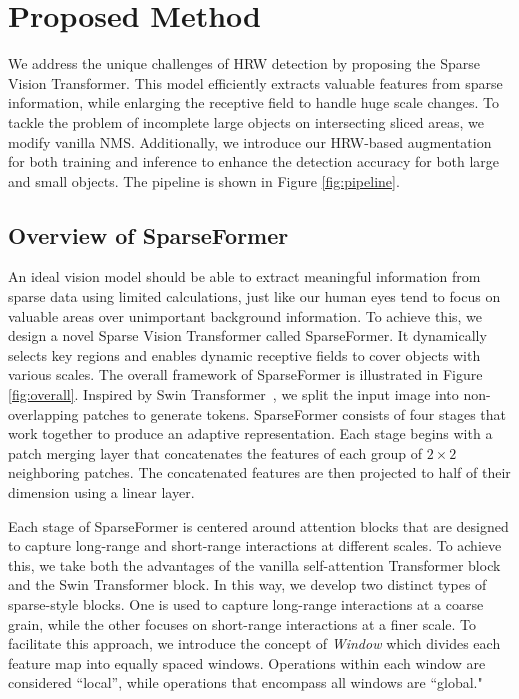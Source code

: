 \section{Proposed Method}


We address the unique challenges of HRW detection by proposing the Sparse Vision Transformer. This model efficiently extracts valuable features from sparse information, while enlarging the receptive field to handle huge scale changes. To tackle the problem of incomplete large objects on intersecting sliced areas, we modify vanilla NMS. Additionally, we introduce our HRW-based augmentation for both training and inference to enhance the detection accuracy for both large and small objects. 
The pipeline is shown in Figure \ref{fig:pipeline}.


\subsection{Overview of SparseFormer}


An ideal vision model should be able to extract meaningful information from sparse data using limited calculations, just like our human eyes tend to focus on valuable areas over unimportant background information. To achieve this, we design a novel Sparse Vision Transformer called SparseFormer. It dynamically selects key regions and enables dynamic receptive fields to cover objects with various scales. The overall framework of SparseFormer is illustrated in Figure \ref{fig:overall}. 
%
Inspired by Swin Transformer~\cite{liu2021swin}, we split the input image into non-overlapping patches to generate tokens. SparseFormer consists of four stages that work together to produce an adaptive representation. Each stage begins with a patch merging layer that concatenates the features of each group of $2\times2$ neighboring patches. The concatenated features are then projected to half of their dimension using a linear layer.

Each stage of SparseFormer is centered around attention blocks that are designed to capture long-range and short-range interactions at different scales. To achieve this, we take both the advantages of the vanilla self-attention Transformer block and the Swin Transformer block. In this way, we develop two distinct types of sparse-style blocks. One is used to capture long-range interactions at a coarse grain, while the other focuses on short-range interactions at a finer scale. To facilitate this approach, we introduce the concept of \emph{Window} which divides each feature map into equally spaced windows. Operations within each window are considered ``local'', while operations that encompass all windows are ``global." %



